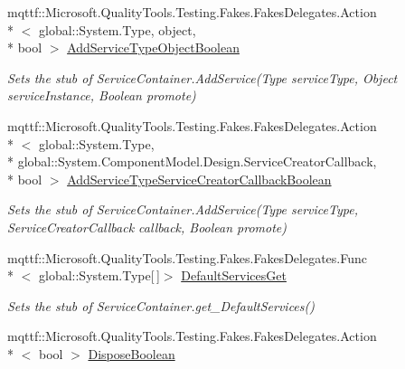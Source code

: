 \begin{DoxyCompactItemize}
\item 
mqttf\-::\-Microsoft.\-Quality\-Tools.\-Testing.\-Fakes.\-Fakes\-Delegates.\-Action\\*
$<$ global\-::\-System.\-Type, object, \\*
bool $>$ \hyperlink{class_system_1_1_component_model_1_1_design_1_1_fakes_1_1_stub_service_container_af8857e6e907ab3c52277d9e24ddc17f1}{Add\-Service\-Type\-Object\-Boolean}
\begin{DoxyCompactList}\small\item\em Sets the stub of Service\-Container.\-Add\-Service(\-Type service\-Type, Object service\-Instance, Boolean promote)\end{DoxyCompactList}\item 
mqttf\-::\-Microsoft.\-Quality\-Tools.\-Testing.\-Fakes.\-Fakes\-Delegates.\-Action\\*
$<$ global\-::\-System.\-Type, \\*
global\-::\-System.\-Component\-Model.\-Design.\-Service\-Creator\-Callback, \\*
bool $>$ \hyperlink{class_system_1_1_component_model_1_1_design_1_1_fakes_1_1_stub_service_container_a65bff657445d519f4c79992e43673cb3}{Add\-Service\-Type\-Service\-Creator\-Callback\-Boolean}
\begin{DoxyCompactList}\small\item\em Sets the stub of Service\-Container.\-Add\-Service(\-Type service\-Type, Service\-Creator\-Callback callback, Boolean promote)\end{DoxyCompactList}\item 
mqttf\-::\-Microsoft.\-Quality\-Tools.\-Testing.\-Fakes.\-Fakes\-Delegates.\-Func\\*
$<$ global\-::\-System.\-Type\mbox{[}$\,$\mbox{]}$>$ \hyperlink{class_system_1_1_component_model_1_1_design_1_1_fakes_1_1_stub_service_container_ad76e981f01a03300f77aa35a7f4bd96b}{Default\-Services\-Get}
\begin{DoxyCompactList}\small\item\em Sets the stub of Service\-Container.\-get\-\_\-\-Default\-Services()\end{DoxyCompactList}\item 
mqttf\-::\-Microsoft.\-Quality\-Tools.\-Testing.\-Fakes.\-Fakes\-Delegates.\-Action\\*
$<$ bool $>$ \hyperlink{class_system_1_1_component_model_1_1_design_1_1_fakes_1_1_stub_service_container_a82b5539043e3d79e170676966e5152ae}{Dispose\-Boolean}

\end{DoxyCompactItemize}
